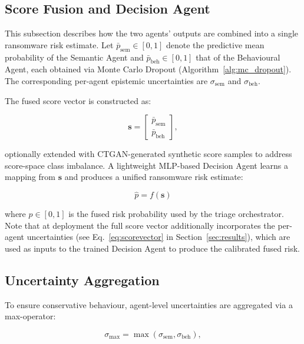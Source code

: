 \documentclass[lettersize,journal]{IEEEtran}
\begin{document}
\subsection{Score Fusion and Decision Agent}


\cbstart
This subsection describes how the two agents' outputs are combined into a single ransomware risk estimate.
Let $\bar{p}_{\text{sem}} \in [0,1]$ denote the predictive mean probability of the Semantic Agent
and $\bar{p}_{\text{beh}} \in [0,1]$ that of the Behavioural Agent, each obtained via Monte Carlo
Dropout (Algorithm~\ref{alg:mc_dropout}).
The corresponding per-agent epistemic uncertainties are $\sigma_{\text{sem}}$ and $\sigma_{\text{beh}}$.
\cbend

The fused score vector is constructed as:

\begin{equation}
\mathbf{s} =
\begin{bmatrix}
\bar{p}_{\text{sem}} \\
\bar{p}_{\text{beh}}
\end{bmatrix},
\label{eq:scorevec_basic}
\end{equation}

optionally extended with CTGAN-generated synthetic score samples to address score-space class imbalance.
A lightweight MLP-based Decision Agent learns a mapping from $\mathbf{s}$ and produces a unified
ransomware risk estimate:

\begin{equation}
\hat{p} = f(\mathbf{s})
\label{eq:scorepool}
\end{equation}


\cbstart
where $\hat{p} \in [0,1]$ is the fused risk probability used by the triage orchestrator.
Note that at deployment the full score vector additionally incorporates the per-agent uncertainties
(see Eq.~\ref{eq:scorevector} in Section~\ref{sec:results}), which are used as inputs to the
trained Decision Agent to produce the calibrated fused risk.
\cbend


\subsection{Uncertainty Aggregation}

To ensure conservative behaviour, agent-level uncertainties are aggregated via a max-operator:

\begin{equation}
\sigma_{\max} = \max(\sigma_{\text{sem}}, \sigma_{\text{beh}}),
\label{eq:sigmamax}
\end{equation}
\end{document}
